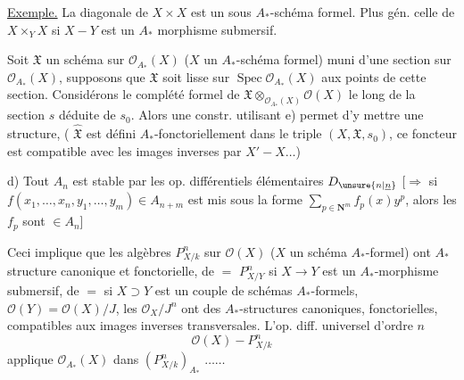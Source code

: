 \uline{Exemple.} La diagonale de $X\times X$ est un sous $A_*$-schéma formel. Plus gén. celle de $X\times_Y X$ si $X\mathbin{-}Y$ est un $A_*$ morphisme submersif. 

Soit $\mathfrak X$ un schéma sur $\mathcal O_{A_*}(X)$ ($X$ un $A_*$-schéma formel) muni d'une section  sur $\mathcal O_{A_*}(X)$, supposons que $\mathfrak X$ soit lisse sur $\operatorname{Spec}\mathcal O_{A_*}(X)$ aux points de cette section. Considérons le complété formel  de $\mathfrak X\otimes_{\mathcal O_{A_*}(X)}\mathcal O(X)$ le long de la section $s$ déduite de $s_0$. Alors une constr. utilisant e) permet d'y mettre une  structure,  ( $\hat{\mathfrak X}$ est défini $A_*$-fonctoriellement dans le triple $(X,\mathfrak X,s_0)$, ce foncteur est compatible avec les images inverses par $X'\mathbin{-}X\ldots$)

d) Tout $A_n$ est stable par les op. différentiels élémentaires $D_{\unsure{n|\underline n}}$ [$\Longrightarrow$ si $f(x_1,\ldots,x_n,y_1,\ldots,y_m)\in A_{n+m}$ est mis sous la forme $\sum_{p\in\mathbf N^m}f_p(x)y^p$, alors les $f_p$ sont $\in A_n$]

Ceci implique que les algèbres $P^n_{X/k}$ sur $\mathcal O(X)$ ($X$ un  schéma $A_*$-formel) ont  $A_*$ structure canonique et fonctorielle, de $=$ $P^n_{X/Y}$ si $X\to Y$ est un $A_*$-morphisme submersif, de $=$  si $X\supset Y$ est un couple de schémas $A_*$-formels, $\mathcal O(Y)=\mathcal O(X)/J$, les  $\mathcal O_X/J^n$ ont des $A_*$-structures canoniques, fonctorielles, compatibles aux images inverses transversales. L'op. diff. universel d'ordre $n$
\[
\mathcal O(X)\mathbin{-}P^n_{X/k}
\]
 applique $\mathcal O_{A_*}(X)$ dans $(P^n_{X/k})_{A_*}$  $\ldots\ldots$

